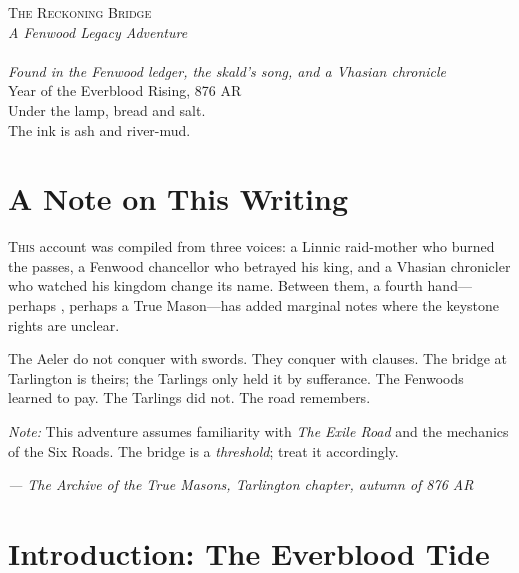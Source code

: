 \documentclass[11pt,a5paper]{book}
\begin{document}
\frontmatter
\thispagestyle{empty}
\begin{center}
\vspace*{2cm}
{\Huge\scshape The Reckoning Bridge}\\[1em]
{\Large\textit{A Fenwood Legacy Adventure}}\\[2em]
{\large\gray}\\[0.5em]
{\normalsize\textit{Found in the Fenwood ledger, the skald's song, and a Vhasian chronicle}}\\[2em]
\vfill
{\small Year of the Everblood Rising, 876 AR}\\[1em]
{\small Under the lamp, bread and salt.\\The ink is ash and river-mud.}
\end{center}

\clearpage

\tableofcontents

\clearpage

\chapter*{A Note on This Writing}

\lettrine{T}{his} account was compiled from three voices: a Linnic raid-mother who burned the passes, a Fenwood chancellor who betrayed his king, and a Vhasian chronicler who watched his kingdom change its name. Between them, a fourth hand---perhaps \gray, perhaps a True Mason---has added marginal notes where the keystone rights are unclear.

The Aeler do not conquer with swords. They conquer with clauses. The bridge at Tarlington is theirs; the Tarlings only held it by sufferance. The Fenwoods learned to pay. The Tarlings did not. The road remembers.

\textit{Note:} This adventure assumes familiarity with \textit{The Exile Road} and the mechanics of the Six Roads. The bridge is a \textit{threshold}; treat it accordingly.

\vspace{1em}
\noindent\textit{--- The Archive of the True Masons, Tarlington chapter, autumn of 876 AR}

\mainmatter

\chapter{Introduction: The Everblood Tide}
\end{document}
